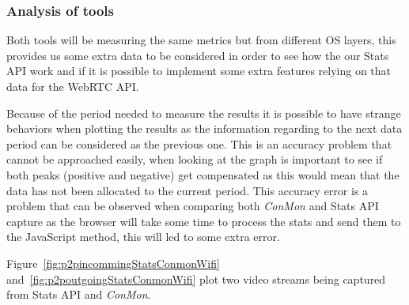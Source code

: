 

\subsubsection{Analysis of tools}

Both tools will be measuring the same metrics but from different OS layers, this provides us some extra data to be considered in order to see how the our Stats API work and if it is possible to implement some extra features relying on that data for the WebRTC API.

Because of the period needed to measure the results it is possible to have strange behaviors when plotting the results as the information regarding to the next data period can be considered as the previous one. This is an accuracy problem that cannot be approached easily, when looking at the graph is important to see if both peaks (positive and negative) get compensated as this would mean that the data has not been allocated to the current period. This accuracy error is a problem that can be observed when comparing both {\it ConMon} and Stats API capture as the browser will take some time to process the stats and send them to the JavaScript method, this will led to some extra error.

Figure~\ref{fig:p2pincommingStatsConmonWifi} and~\ref{fig:p2poutgoingStatsConmonWifi} plot two video streams being captured from Stats API and {\it ConMon}.

